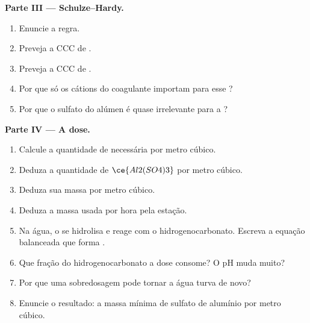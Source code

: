 \begin{problem}
\medskip\noindent\textbf{Parte III --- Schulze--Hardy.}
\begin{enumerate}[resume]
  \item Enuncie a regra.
  \item Preveja a CCC de .
  \item Preveja a CCC de .
  \item Por que só os cátions do coagulante importam para esse ?
  \item Por que o sulfato do alúmen é quase irrelevante para a ?
\end{enumerate}

\medskip\noindent\textbf{Parte IV --- A dose.}
\begin{enumerate}[resume]
  \item Calcule a quantidade de  necessária por metro cúbico.
  \item Deduza a quantidade de $\ce{Al2(SO4)3}$ por metro cúbico.
  \item Deduza sua massa por metro cúbico.
  \item Deduza a massa usada por hora pela estação.
  \item Na água, o  se hidrolisa e reage com o hidrogenocarbonato. Escreva a
        equação balanceada que forma .
  \item Que fração do hidrogenocarbonato a dose consome? O pH muda muito?
  \item Por que uma sobredosagem pode tornar a água turva de novo?
  \item Enuncie o resultado: a massa mínima de sulfato de alumínio por metro cúbico.
\end{enumerate}
\end{problem}
